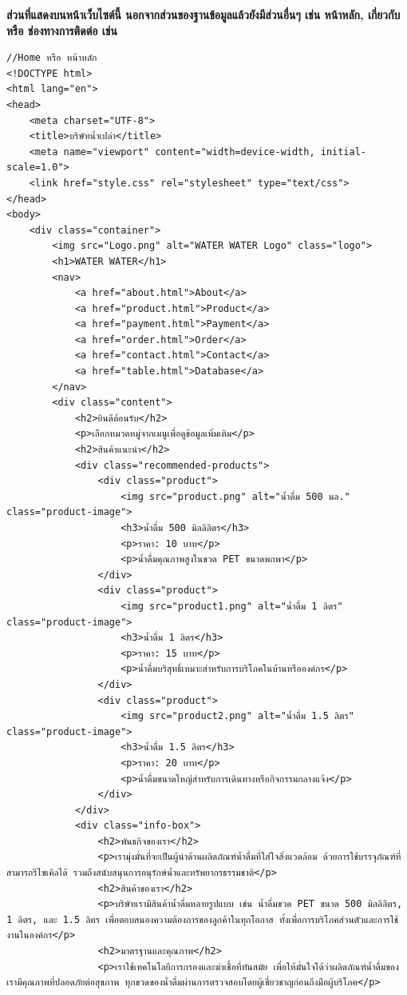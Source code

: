\documentclass{report}
\begin{document}
\textbf{ส่วนที่แสดงบนหน้าเว็บไซต์นี้ นอกจากส่วนของฐานข้อมูลแล้วยังมีส่วนอื่นๆ เช่น หน้าหลัก, เกี่ยวกับ หรือ ช่องทางการติดต่อ เช่น}
\begin{verbatim}
//Home หรือ หน้าหลัก
<!DOCTYPE html>
<html lang="en">
<head>
    <meta charset="UTF-8">
    <title>บริษัทน้ำเปล่า</title>
    <meta name="viewport" content="width=device-width, initial-scale=1.0">
    <link href="style.css" rel="stylesheet" type="text/css">
</head>
<body>
    <div class="container">
        <img src="Logo.png" alt="WATER WATER Logo" class="logo">
        <h1>WATER WATER</h1>
        <nav>
            <a href="about.html">About</a>
            <a href="product.html">Product</a>
            <a href="payment.html">Payment</a>
            <a href="order.html">Order</a>
            <a href="contact.html">Contact</a>
            <a href="table.html">Database</a>
        </nav>
        <div class="content">
            <h2>ยินดีต้อนรับ</h2>
            <p>เลือกหมวดหมู่จากเมนูเพื่อดูข้อมูลเพิ่มเติม</p>
            <h2>สินค้าแนะนำ</h2>
            <div class="recommended-products">
                <div class="product">
                    <img src="product.png" alt="น้ำดื่ม 500 มล." class="product-image">
                    <h3>น้ำดื่ม 500 มิลลิลิตร</h3>
                    <p>ราคา: 10 บาท</p>
                    <p>น้ำดื่มคุณภาพสูงในขวด PET ขนาดพกพา</p>
                </div>
                <div class="product">
                    <img src="product1.png" alt="น้ำดื่ม 1 ลิตร" class="product-image">
                    <h3>น้ำดื่ม 1 ลิตร</h3>
                    <p>ราคา: 15 บาท</p>
                    <p>น้ำดื่มบริสุทธิ์เหมาะสำหรับการบริโภคในบ้านหรือองค์กร</p>
                </div>
                <div class="product">
                    <img src="product2.png" alt="น้ำดื่ม 1.5 ลิตร" class="product-image">
                    <h3>น้ำดื่ม 1.5 ลิตร</h3>
                    <p>ราคา: 20 บาท</p>
                    <p>น้ำดื่มขนาดใหญ่สำหรับการเดินทางหรือกิจกรรมกลางแจ้ง</p>
                </div>
            </div>
            <div class="info-box">
                <h2>พันธกิจของเรา</h2>
                <p>เรามุ่งมั่นที่จะเป็นผู้นำด้านผลิตภัณฑ์น้ำดื่มที่ใส่ใจสิ่งแวดล้อม ด้วยการใช้บรรจุภัณฑ์ที่สามารถรีไซเคิลได้ รวมถึงสนับสนุนการอนุรักษ์น้ำและทรัพยากรธรรมชาติ</p>
                <h2>สินค้าของเรา</h2>
                <p>บริษัทเรามีสินค้าน้ำดื่มหลายรูปแบบ เช่น น้ำดื่มขวด PET ขนาด 500 มิลลิลิตร, 1 ลิตร, และ 1.5 ลิตร เพื่อตอบสนองความต้องการของลูกค้าในทุกโอกาส ทั้งเพื่อการบริโภคส่วนตัวและการใช้งานในองค์กร</p>
                <h2>มาตรฐานและคุณภาพ</h2>
                <p>เราใช้เทคโนโลยีการกรองและฆ่าเชื้อที่ทันสมัย เพื่อให้มั่นใจได้ว่าผลิตภัณฑ์น้ำดื่มของเรามีคุณภาพที่ปลอดภัยต่อสุขภาพ ทุกขวดของน้ำดื่มผ่านการตรวจสอบโดยผู้เชี่ยวชาญก่อนถึงมือผู้บริโภค</p>

\end{verbatim}
\end{document}
